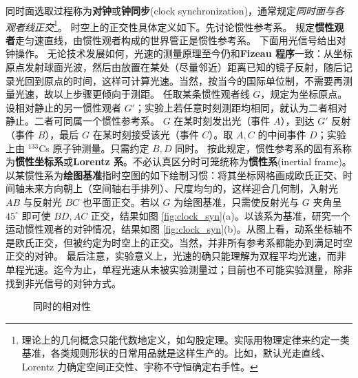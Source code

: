 同时面选取过程称为\textbf{对钟}或\textbf{钟同步}(clock synchronization)，通常规定\textit{同时面与各观者线正交}\footnote{理论上的几何概念只能代数地定义，如勾股定理。实际用物理定律来约定一类基准，各类规则形状的日常用品就是这样生产的。比如，默认光走直线、Lorentz 力确定空间正交性、宇称不守恒确定右手性。}。
时空上的正交性具体定义如下。先讨论惯性参考系。
规定\textbf{惯性观者}走匀速直线，由惯性观者构成的世界管正是惯性参考系。
下面用光信号给出对钟操作。
无论技术发展如何，光速的测量原理至今仍和\textbf{Fizeau 程序}一致：从坐标原点发射球面光波，然后由放置在某处（尽量邻近）距离已知的镜子反射，随后记录光回到原点的时间，这样可计算光速。当然，按当今的国际单位制，不需要再测量光速，故以上步骤更倾向于测距。
任取某条惯性观者线 $G$，规定为坐标原点。设相对静止的另一惯性观者 $G'$；实验上若任意时刻测距均相同，就认为二者相对静止。二者可同属一个惯性参考系。
$G$ 在某时刻发出光（事件 $A$），到达 $G'$ 反射（事件 $B$），最后 $G$ 在某时刻接受该光（事件 $C$）。取 $A,C$ 的中间事件 $D$；实验上由 $^{133}$Cs 原子钟测量。只需约定 $B,D$ 同时。
按此规定，惯性参考系的固有系称为\textbf{惯性坐标系}或\textbf{Lorentz 系}。不必认真区分时可笼统称为\textbf{惯性系}(inertial frame)。
以某惯性系为\textbf{绘图基准}指时空图的如下绘制习惯：将其坐标网格画成欧氏正交、时间轴未来方向朝上（空间轴右手排列）、尺度均匀的，这样迎合几何制，入射光 $AB$ 与反射光 $BC$ 也平面正交。若以 $G$ 为绘图基准，只需使反射光与 $G$ 夹角呈 $45^\circ$ 即可使 $BD,AC$ 正交，结果如图 \ref{fig:clock_syn}(a)。以该系为基准，研究一个运动惯性观者的对钟情况，结果如图 \ref{fig:clock_syn}(b)。从图上看，动系坐标轴不是欧氏正交，但被约定为时空上的正交。当然，并非所有参考系都能办到满足时空正交的对钟。
最后注意，实验意义上，光速的确只能理解为双程平均光速，而非单程光速。迄今为止，单程光速从未被实验测量过；目前也不可能实验测量，除非找到非光信号的对钟方式。


\begin{figure}[ht]
    \centering
    \quad
    \caption{同时的相对性}
    \label{fig:simurela}
\end{figure}

